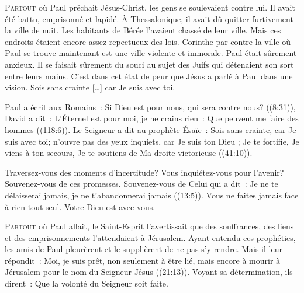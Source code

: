 \lettrine{P}{artout} où Paul prêchait Jésus-Christ,
 les gens se soulevaient contre lui. Il avait été battu, emprisonné et lapidé.
 À Thessalonique, il avait dû quitter furtivement la ville de nuit.
 Les habitants de Bérée l'avaient chassé de leur ville.
 Mais ces endroits étaient encore assez repectueux des lois.
 Corinthe par contre \ocadr la ville où Paul se trouve maintenant \fcadr{} est
 une ville violente et immorale. Paul était sûrement anxieux.
 Il se faisait sûrement du souci au sujet des Juifs qui détenaient
 son sort entre leurs mains. C'est dans cet état de peur que Jésus
 a parlé à Paul dans une vision.
 \og Sois sans crainte [\dots{}] car Je suis avec toi. \fg{}


Paul a écrit aux Romains~: 
 \og Si Dieu est pour nous, qui sera contre nous? \fg{} ((8:31)),
 David a dit~: 
 \og L'Éternel est pour moi, je ne crains rien~:
 Que peuvent me faire des hommes \fg{} ((118:6)).
 Le Seigneur a dit au prophète Ésaïe~: 
 \og Sois sans crainte, car Je suis avec toi; n'ouvre pas des yeux inquiets,
 car Je suis ton Dieu ; Je te fortifie, Je viens à ton secours,
 Je te soutiens de Ma droite victorieuse \fg{} ((41:10)).

Traversez-vous des moments d'incertitude? Vous inquiétez-vous pour l'avenir?
 Souvenez-vous de ces promesses. Souvenez-vous de Celui qui a dit~: 
 \og Je ne te délaisserai jamais, je ne t'abandonnerai jamais \fg{}
 ((13:5)).
 Vous ne faites jamais face à rien tout seul. Votre Dieu est avec vous.

\dvrule






\lettrine{P}{artout} où Paul allait, le Saint-Esprit l'avertissait
 que des souffrances, des liens et des emprisonnements l'attendaient
 à Jérusalem. Ayant entendu ces prophéties, les amis de Paul pleurèrent
 et le supplièrent de ne pas s'y rendre. Mais il leur répondit~:
 \og Moi, je suis prêt, non seulement à être lié,
 mais encore à mourir à Jérusalem pour le nom du Seigneur Jésus \fg{}
 ((21:13)). Voyant sa détermination, ils dirent~: 
 \og Que la volonté du Seigneur soit faite. \fg{}

